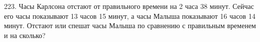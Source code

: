 223. Часы Карлсона отстают от правильного времени на 2 часа 38 минут. Сейчас его часы показывают 13 часов 15 минут, а часы Малыша показывают 16 часов 14 минут. Отстают или спешат часы Малыша по сравнению с правильным временем и на сколько?\\
